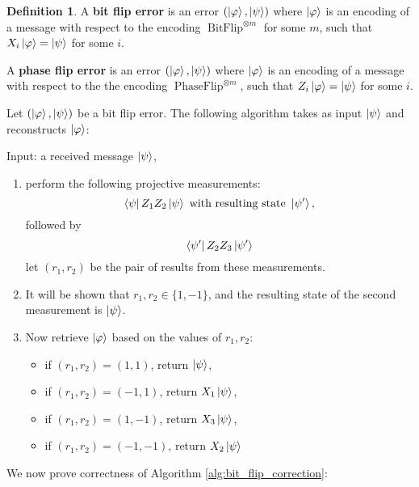 \documentclass[12pt]{article}
\theoremstyle{plain}
\theoremstyle{definition}
\newtheorem{defn}[thm]{Definition} %
\begin{document}
\begin{defn}
	A \textbf{bit flip error} is an error $(\ket{\varphi},\ket{\psi})$ where $\ket{\varphi}$ is an encoding of a message with respect to the encoding $\operatorname{BitFlip}^{\otimes m}$ for some $m$, such that $X_i\ket{\varphi} =\ket{\psi}$ for some $i$.
	
	A \textbf{phase flip error} is an error $(\ket{\varphi},\ket{\psi})$ where $\ket{\varphi}$ is an encoding of a message with respect to the the encoding $\operatorname{PhaseFlip}^{\otimes m}$, such that $Z_i\ket{\varphi} =\ket{\psi}$ for some $i$.
\end{defn}
Let $(\ket{\varphi},\ket{\psi})$ be a bit flip error.  The following algorithm takes as input $\ket{\psi}$ and reconstructs $\ket{\varphi}$:
\begin{algorithm}\label{alg:bit_flip_correction}
	Input: a received message $\ket{\psi}$,
	\begin{enumerate}
		\item perform the following projective measurements:
		\begin{equation}
			\bra{\psi} Z_1 Z_2 \ket{\psi}\text{ with resulting state }\ket{\psi'},
		\end{equation}
		followed by
		\begin{equation}
			\bra{\psi'} Z_2 Z_3 \ket{\psi'}
		\end{equation}
		let $(r_1,r_2)$ be the pair of results from these measurements.
		\item It will be shown that $r_1,r_2 \in \lbrace 1,-1\rbrace$, and the resulting state of the second measurement is $\ket{\psi}$.
		\item Now retrieve $\ket{\varphi}$ based on the values of $r_1,r_2$:
		\begin{itemize}
			\item if $(r_1, r_2) = (1,1)$, return $\ket{\psi}$,
			\item if $(r_1,r_2) = (-1,1)$, return $X_1 \ket{\psi}$,
			\item if $(r_1,r_2) = (1,-1)$, return $X_3 \ket{\psi}$,
			\item if $(r_1,r_2) = (-1,-1)$, return $X_2 \ket{\psi}$
		\end{itemize}
	\end{enumerate}
\end{algorithm}
We now prove correctness of Algorithm \ref{alg:bit_flip_correction}:
\end{document}
